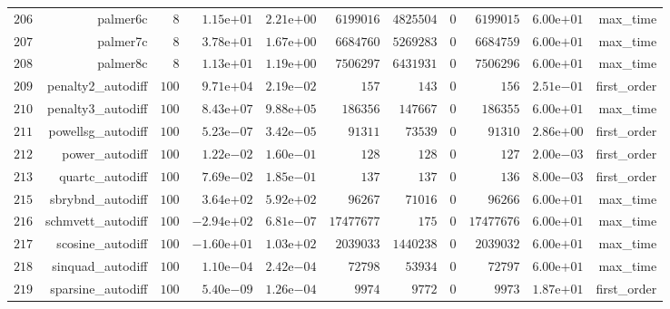 \documentclass[varwidth=20cm,crop=true]{standalone}
\begin{document}
\begin{longtable}{rrrrrrrrrrr}
  \(   206\) & palmer6c & \(     8\) & \( 1.15\)e\(+01\) & \( 2.21\)e\(+00\) & \(6199016\) & \(4825504\) & \(     0\) & \(6199015\) & \( 6.00\)e\(+01\) & max\_time \\
  \(   207\) & palmer7c & \(     8\) & \( 3.78\)e\(+01\) & \( 1.67\)e\(+00\) & \(6684760\) & \(5269283\) & \(     0\) & \(6684759\) & \( 6.00\)e\(+01\) & max\_time \\
  \(   208\) & palmer8c & \(     8\) & \( 1.13\)e\(+01\) & \( 1.19\)e\(+00\) & \(7506297\) & \(6431931\) & \(     0\) & \(7506296\) & \( 6.00\)e\(+01\) & max\_time \\
  \(   209\) & penalty2\_autodiff & \(   100\) & \( 9.71\)e\(+04\) & \( 2.19\)e\(-02\) & \(   157\) & \(   143\) & \(     0\) & \(   156\) & \( 2.51\)e\(-01\) & first\_order \\
  \(   210\) & penalty3\_autodiff & \(   100\) & \( 8.43\)e\(+07\) & \( 9.88\)e\(+05\) & \(186356\) & \(147667\) & \(     0\) & \(186355\) & \( 6.00\)e\(+01\) & max\_time \\
  \(   211\) & powellsg\_autodiff & \(   100\) & \( 5.23\)e\(-07\) & \( 3.42\)e\(-05\) & \( 91311\) & \( 73539\) & \(     0\) & \( 91310\) & \( 2.86\)e\(+00\) & first\_order \\
  \(   212\) & power\_autodiff & \(   100\) & \( 1.22\)e\(-02\) & \( 1.60\)e\(-01\) & \(   128\) & \(   128\) & \(     0\) & \(   127\) & \( 2.00\)e\(-03\) & first\_order \\
  \(   213\) & quartc\_autodiff & \(   100\) & \( 7.69\)e\(-02\) & \( 1.85\)e\(-01\) & \(   137\) & \(   137\) & \(     0\) & \(   136\) & \( 8.00\)e\(-03\) & first\_order \\
  \(   215\) & sbrybnd\_autodiff & \(   100\) & \( 3.64\)e\(+02\) & \( 5.92\)e\(+02\) & \( 96267\) & \( 71016\) & \(     0\) & \( 96266\) & \( 6.00\)e\(+01\) & max\_time \\
  \(   216\) & schmvett\_autodiff & \(   100\) & \(-2.94\)e\(+02\) & \( 6.81\)e\(-07\) & \(17477677\) & \(   175\) & \(     0\) & \(17477676\) & \( 6.00\)e\(+01\) & max\_time \\
  \(   217\) & scosine\_autodiff & \(   100\) & \(-1.60\)e\(+01\) & \( 1.03\)e\(+02\) & \(2039033\) & \(1440238\) & \(     0\) & \(2039032\) & \( 6.00\)e\(+01\) & max\_time \\
  \(   218\) & sinquad\_autodiff & \(   100\) & \( 1.10\)e\(-04\) & \( 2.42\)e\(-04\) & \( 72798\) & \( 53934\) & \(     0\) & \( 72797\) & \( 6.00\)e\(+01\) & max\_time \\
  \(   219\) & sparsine\_autodiff & \(   100\) & \( 5.40\)e\(-09\) & \( 1.26\)e\(-04\) & \(  9974\) & \(  9772\) & \(     0\) & \(  9973\) & \( 1.87\)e\(+01\) & first\_order \\

\end{longtable}
\end{document}
